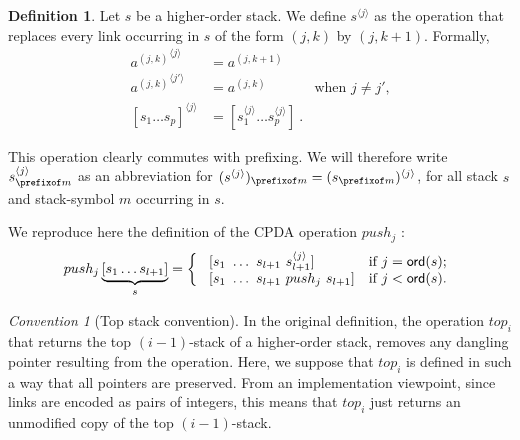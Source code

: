 \documentclass[a4paper]{article}
\theoremstyle{remark}
\newtheorem{convention}{Convention}[section]
\theoremstyle{definition}
\newtheorem{definition}{Definition}[section]
\begin{document}


\begin{definition}
Let $s$ be a higher-order stack. We define $s^{\langle j \rangle}$ as the operation that replaces
every link occurring in $s$ of the form $(j,k)$ by $(j,k+1)$. Formally,
\begin{align*}
{a^{(j,k)}}^{\langle j \rangle} &= a^{(j,k+1)}   \\
{a^{(j,k)}}^{\langle j' \rangle} &= a^{(j,k)} &   \mbox{when $j\neq j'$,}\\
[s_1 \ldots s_p]^{\langle j \rangle} &= [s_1^{\langle j \rangle} \ldots s_p^{\langle j \rangle}] \ .
\end{align*}
\end{definition}
This operation clearly commutes with prefixing. We will therefore write $s^{\langle j\rangle}_{\prefixof m}$ as an abbreviation for
$(s^{\langle j\rangle})_{\prefixof m} = (s_{\prefixof m})^{\langle j\rangle}$,
for all stack $s$ and stack-symbol $m$ occurring in $s$.


We reproduce here the definition of the CPDA operation $push_j$ \cite{hmos-lics08}:
$$ push_j \underbrace{[ s_1 \ldots s_{l+1} ]}_{s} =
\left\{
  \begin{array}{ll}
\    [s_1\ \ldots\ s_{l+1}\ s_{l+1}^{\langle j \rangle}]  &\hbox{if $j = {\sf ord}(s)$;}\\
\    [s_1\ \ldots\ s_{l+1}\ push_j\ s_{l+1}]  &\hbox{if $j<{\sf ord}(s)$.}
 \end{array}
\right.
$$


\begin{convention}[Top stack convention]
\label{conv:top_preserve_links}
In the original definition, the operation $top_i$ that returns the top $(i-1)$-stack of a higher-order stack, removes any dangling pointer resulting from the operation. Here, we suppose that $top_i$ is defined in such a way that all pointers are preserved. From an implementation viewpoint, since links are encoded as pairs of integers, this means that $top_i$ just returns an unmodified copy of the top $(i-1)$-stack.
\end{convention}
\end{document}
